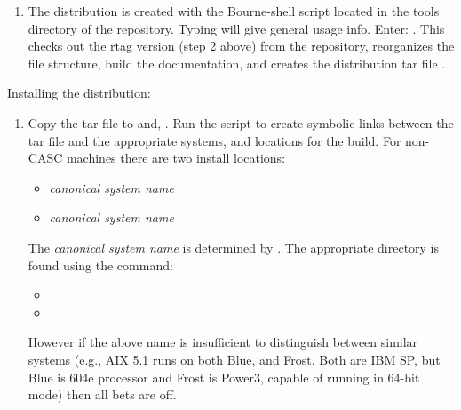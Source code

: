 \begin{enumerate}
   \item The distribution is created with the  
   Bourne-shell script located in the tools directory of the 
   \hypre{} repository.  Typing  will give 
   general usage info. Enter: . This checks 
   out the rtag version (step 2 above) from the repository,
   reorganizes the file structure, build the documentation,
   and creates the distribution tar file .

\end{enumerate}

Installing the \hypre{} distribution:

\begin{enumerate}

   \item Copy the tar file  to 
    and, .
   Run the script  to create symbolic-links
   between the tar file and the 
   appropriate systems, and locations for the build. For non-CASC 
   machines there are two install locations:
      \begin{itemize}
       \item {}\textit{canonical system name}
       \item {}\textit{canonical system name}
      \end{itemize}
   The \textit{canonical system name} is determined by 
   . The appropriate directory is found using
   the command:
      \begin{itemize}
       \item {}
       \item {}
      \end{itemize}
   However if the above name is insufficient to distinguish between
   similar systems (e.g., AIX 5.1 runs on both Blue, and Frost. Both
   are IBM SP, but Blue is 604e processor and Frost is Power3, capable
   of running in 64-bit mode) then all bets are off. 
   

\end{enumerate}
